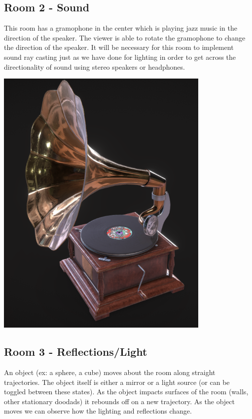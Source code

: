 \documentclass[12pt,a4paper]{report}
\begin{document}
\subsection*{Room 2 - Sound}
\par This room has a gramophone in the center which is playing jazz music in the direction of the speaker. The viewer is able to rotate the gramophone to change the direction of the speaker. It will be necessary for this room to implement sound ray casting just as we have done for lighting in order to get across the directionality of sound using stereo speakers or headphones.
\begin{center}
\includegraphics[scale=0.5]{img/gramophone.png}
\end{center}

\subsection*{Room 3 - Reflections/Light}
\par An object (ex: a sphere, a cube) moves about the room along straight trajectories. The object itself is either a mirror or a light source (or can be toggled between these states). As the object impacts surfaces of the room (walls, other stationary doodads) it rebounds off on a new trajectory. As the object moves we can observe how the lighting and reflections change.
\end{document}
